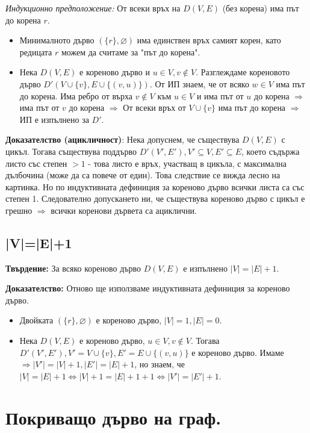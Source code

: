 \documentclass[fleqn,12pt]{article}
\begin{document}
\textit{Индукционно предположение:} От всеки връх на $D(V,E)$ (без корена) има път до корена $r$. 
\begin{itemize}
	\item Минималното дърво $(\{r\}, \varnothing)$ има единствен връх самият корен, като редицата $r$ можем да считаме за "път до корена".
	\item Нека $D(V,E)$ е кореново дърво и $u \in V, v \notin V$. Разглеждаме кореновото дърво $D'(V \cup \{v\}, E \cup \{ (v, u)\})$.
	От ИП знаем, че от всяко $w \in V$ има път до корена. Има ребро от върха $v \notin V$ към $u \in V$ и има път от $u$ до корена $\Rightarrow$
	има път от $v$ до корена $\Rightarrow$ От всеки връх от $V \cup \{v\}$ има път до корена $\Rightarrow$ ИП е изпълнено за $D'$.
\end{itemize}

\textbf{Доказателство (ацикличност)}: Нека допуснем, че съществува $D(V,E)$ с цикъл. Тогава съществува поддърво $D'(V', E'), V' \subseteq V, E' \subseteq E$, 
което съдържа листо със степен $>1$ - това листо е връх, участващ в цикъла, с максимална дълбочина (може да са повече от един). Това следствие се вижда лесно на картинка. 
Но по индуктивната дефиниция за кореново дърво всички листа са със степен 1. Следователно допускането ни, че съществува кореново дърво с цикъл е грешно $\Rightarrow$ всички коренови дървета
са ациклични.
\vspace{10mm}

\subsection{|V|=|E|+1}
\textbf{Твърдение:} За всяко кореново дърво $D(V,E)$ е изпълнено $|V| = |E| + 1$.

\textbf{Доказателство:} Отново ще използваме индуктивната дефиниция за кореново дърво.
\begin{itemize}
	\item Двойката $(\{r\}, \varnothing)$ е кореново дърво, $|V| = 1, |E| = 0$.
	\item Нека $D(V,E)$ е кореново дърво, $u \in V, v \notin V$. Тогава $D'(V', E'), V' = V \cup \{v\}, E' = E \cup \{ (v, u)\}$ е кореново дърво.
	Имаме $\Rightarrow |V'| = |V| + 1, |E'| = |E| + 1$, но знаем, че $|V| = |E| + 1 \Leftrightarrow |V| + 1 = |E| + 1 + 1 \Leftrightarrow |V'| = |E'| + 1$.
\end{itemize}

\section{Покриващо дърво на граф.}
\end{document}
